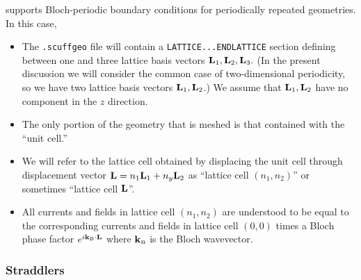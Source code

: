 \lss supports Bloch-periodic boundary conditions for
periodically repeated geometries. In this case,

\begin{itemize}
 \item The \texttt{.scuffgeo} file will contain
       a \texttt{LATTICE...ENDLATTICE} section defining 
       between one and three lattice basis vectors 
       $\mathbf{L}_1, \mathbf{L}_2, \mathbf{L}_3.$ (In the present 
       discussion we will consider the common case
       of two-dimensional periodicity, so we have two
       lattice basis vectors $\mathbf{L}_1, \mathbf{L}_2$.) 
       We assume that $\mathbf{L}_1, \mathbf{L}_2$ have no 
       component in the $z$ direction.
 \item The only portion of the geometry that is
       meshed is that contained with the ``unit cell.''
 \item We will refer to the lattice cell obtained by 
       displacing the unit cell through displacement 
       vector $\mathbf{L}=n_1 \mathbf{L}_1 + n_y \mathbf{L}_2$ as 
       ``lattice cell $(n_1, n_2)$'' or sometimes
       ``lattice cell $\mathbf{L}$''.
 \item All currents and fields in lattice cell $(n_1,n_2)$
       are understood to be equal to the corresponding
       currents and fields in lattice cell $(0,0)$ times
       a Bloch phase factor $e^{i\mathbf{k}_{\hbox{\tiny{B}}} \cdot \mathbf{L}}$ where
       $\mathbf{k}_{\hbox{\tiny{B}}}$ is the Bloch wavevector.
\end{itemize}

\subsubsection{Straddlers}

